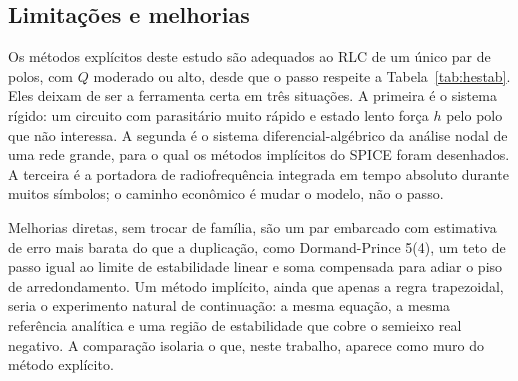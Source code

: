 \subsection{Limitações e melhorias}

Os métodos explícitos deste estudo são adequados ao RLC de um único par de polos, com \(Q\) moderado ou alto, desde que o passo respeite a Tabela~\ref{tab:hestab}. Eles deixam de ser a ferramenta certa em três situações. A primeira é o sistema rígido: um circuito com parasitário muito rápido e estado lento força \(h\) pelo polo que não interessa. A segunda é o sistema diferencial-algébrico da análise nodal de uma rede grande, para o qual os métodos implícitos do SPICE foram desenhados. A terceira é a portadora de radiofrequência integrada em tempo absoluto durante muitos símbolos; o caminho econômico é mudar o modelo, não o passo.

Melhorias diretas, sem trocar de família, são um par embarcado com estimativa de erro mais barata do que a duplicação, como Dormand-Prince 5(4), um teto de passo igual ao limite de estabilidade linear e soma compensada para adiar o piso de arredondamento. Um método implícito, ainda que apenas a regra trapezoidal, seria o experimento natural de continuação: a mesma equação, a mesma referência analítica e uma região de estabilidade que cobre o semieixo real negativo. A comparação isolaria o que, neste trabalho, aparece como muro do método explícito.

